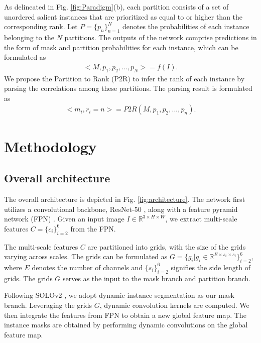 \documentclass[sigconf]{acmart}
\begin{document}
As delineated in Fig. \ref{fig:Paradigm}(b), each partition consists of a set of unordered salient instances that are prioritized as equal to or higher than the corresponding rank. Let $P = \{p_{n}\}_{n=1}^{N}$ denotes the probabilities of each instance belonging to the $N$ partitions. The outputs of the network comprise predictions in the form of mask and partition probabilities for each instance, which can be formulated as
 \begin{equation}
 \begin{split}
<M, p_1, p_2, ...,p_N > = f(I).
 \end{split}
 \end{equation}
We propose the Partition to Rank (P2R) to infer the rank of each instance by parsing the correlations among these partitions. The parsing result is formulated as
 \begin{equation}
 \begin{split}
<m_i, r_\textit{i}=n> = P2R(M, p_1, p_2,..., p_n).
 \end{split}
 \end{equation}

\section{Methodology}
\subsection{Overall architecture}
The overall architecture is depicted in Fig. \ref{fig:architecture}. The network first utilizes a convolutional backbone, ResNet-50 \cite{he2016deep}, along with a feature pyramid network (FPN) \cite{lin2017feature}. Given an input image $I\in\mathbb{R}^{3\times H\times W}$, we extract multi-scale features $C = \{c_{i}\}_{i=2}^6$ from the FPN.

The multi-scale features $C$ are partitioned into grids, with the size of the grids varying across scales. The grids can be formulated as $G = \{g_{i}|g_{i}\in\mathbb{R}^{E\times s_{i}\times s_{i}}\}_{i=2}^6$, where $E$ denotes the number of channels and $\{s_{i}\}_{i=2}^6$ signifies the side length of grids. The grids $G$ serves as the input to the mask branch and partition branch.

Following SOLOv2 \cite{wang2020solov2}, we adopt dynamic instance segmentation as our mask branch. Leveraging the grids $G$, dynamic convolution kernels are computed. We then integrate the features from FPN to obtain a new global feature map. The instance masks are obtained by performing dynamic convolutions on the global feature map.
\end{document}

